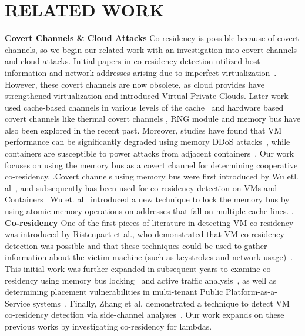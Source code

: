 \section{RELATED WORK}
\label{sec:relatedwork}

\textbf{Covert Channels \& Cloud Attacks}
Co-residency is possible because of covert channels, so we begin our related work with an investigation into covert channels and cloud attacks. Initial papers in co-residency detection utilized host information and network addresses arising due to imperfect virtualization~\cite{ristenpartccs2009}. However, these covert channels are now obsolete, as cloud provides have strengthened virtualization and introduced Virtual Private Clouds. Later work used cache-based channels in various levels of the cache~\cite{xuccsw2011, zhangccs2014, liu2015, kaylaap2016} and hardware based covert channels like thermal covert channels \cite{mastiusenix2015}, RNG module \cite{evtyushkinccs2016} and memory bus \cite{wuusenix2012} have also been  explored in the recent past. Moreover, studies have found that VM performance can be significantly degraded using memory DDoS attacks~\cite{zhang2016memory}, while containers are susceptible to power attacks from adjacent containers~\cite{gao2017}. Our work focuses on using the memory bus as a covert channel for determining cooperative co-residency. .Covert channels using memory bus were first introduced by Wu etl. al~\cite{whispers}, and subsequently has been used for co-residency detection on VMs and Containers~\cite{compstudycoresidency,varad191016}  Wu et. al~\cite{whispers} introduced a new technique to lock the memory bus by using atomic memory operations on addresses that fall on multiple cache lines. .
\\

\textbf{Co-residency} 
  One of the first pieces of literature in detecting VM co-residency was introduced by Ristenpart et al., who demonstrated that VM co-residency detection was possible and that these techniques could be used to gather information about the victim machine (such as keystrokes and network usage)~\cite{ristenpartccs2009}. This initial work was further expanded in subsequent years to examine co-residency using memory bus locking~\cite{xuusenix2015} and active traffic analysis~\cite{bates2012}, as well as determining placement vulnerabilities in multi-tenant Public Platform-as-a-Service systems~\cite{varadarajan2015, zhangpaas2016}. Finally, Zhang et al. demonstrated a technique to detect VM co-residency detection via side-channel analyses~\cite{zhang2011}. Our work expands on these previous works by investigating co-residency for lambdas.\\

